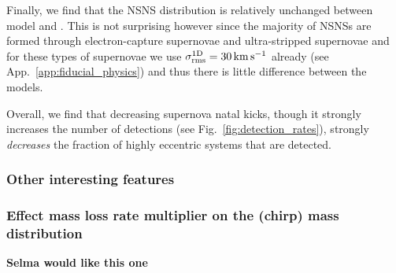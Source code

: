 Finally, we find that the NSNS distribution is relatively unchanged between model \modFid{} and \modSigLower{}. This is not surprising however since the majority of NSNSs are formed through electron-capture supernovae and ultra-stripped supernovae and for these types of supernovae we use $\sigma^{\rm 1D}_{\rm rms} = 30 \unit{km}{s^{-1}}$ already (see App.~\ref{app:fiducial_physics}) and thus there is little difference between the models.

Overall, we find that decreasing supernova natal kicks, though it strongly increases the number of detections (see Fig.~\ref{fig:detection_rates}), strongly \textit{decreases} the fraction of highly eccentric systems that are detected.

\subsubsection{Other interesting features}

\subsubsection{Effect mass loss rate multiplier on the (chirp) mass distribution}

{\bf Selma would like this one}

